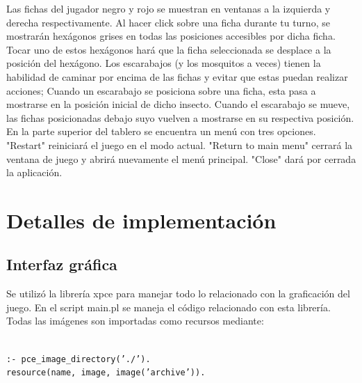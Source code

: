 \documentclass[a4paper,12pt]{article}
\begin{document}
Las fichas del jugador negro y rojo se muestran en ventanas a la izquierda y derecha respectivamente. Al hacer click sobre una ficha durante tu turno, se mostrarán hexágonos grises en todas las posiciones accesibles por dicha ficha. Tocar uno de estos hexágonos hará que la ficha seleccionada se desplace a la posición del hexágono. Los escarabajos (y los mosquitos a veces) tienen la habilidad de caminar por encima de las fichas y evitar que estas puedan realizar acciones; Cuando un escarabajo se posiciona sobre una ficha, esta pasa a mostrarse en la posición inicial de dicho insecto. Cuando el escarabajo se mueve, las fichas posicionadas debajo suyo vuelven a mostrarse en su respectiva posición.\\
En la parte superior del tablero se encuentra un menú con tres opciones. "Restart" reiniciará el juego en el modo actual. "Return to main menu" cerrará la ventana de juego y abrirá nuevamente el menú principal. "Close" dará por cerrada la aplicación.

\section*{Detalles de implementación}
\subsection*{Interfaz gráfica}
Se utilizó la librería xpce para manejar todo lo relacionado con la graficación del juego. En el script main.pl se maneja el código relacionado con esta librería. Todas las imágenes son importadas como recursos mediante: 

\texttt{\\:- pce\_image\_directory('./').\\ resource(name, image, image('archive')).} \\
\end{document}
